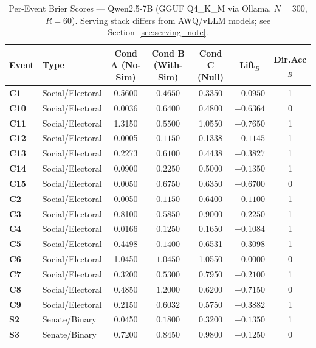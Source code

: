 \documentclass[11pt,journal,onecolumn]{IEEEtran}
\begin{document}
\begin{table}[!htbp]
\centering
\caption{Per-Event Brier Scores --- Qwen2.5-7B (GGUF Q4\_K\_M via Ollama, $N=300$, $R=60$). Serving stack differs from AWQ/vLLM models; see Section~\ref{sec:serving_note}.}
\label{tab:per_event_qwen_7b}
\small
\setlength{\tabcolsep}{4pt}
\begin{tabular}{llccccc}
\toprule
\textbf{Event} & \textbf{Type} & \textbf{Cond A (No-Sim)} & \textbf{Cond B (With-Sim)} & \textbf{Cond C (Null)} & \textbf{Lift$_B$} & \textbf{Dir.Acc$_B$} \\
\midrule
\textbf{C1} & Social/Electoral & 0.5600 & $\mathbf{0.4650}$ & 0.3350 & $\mathbf{+0.0950}$ & 1 \\
\textbf{C10} & Social/Electoral & 0.0036 & $0.6400$ & 0.4800 & $-0.6364$ & 0 \\
\textbf{C11} & Social/Electoral & 1.3150 & $\mathbf{0.5500}$ & 1.0550 & $\mathbf{+0.7650}$ & 1 \\
\textbf{C12} & Social/Electoral & 0.0005 & $0.1150$ & 0.1338 & $-0.1145$ & 1 \\
\textbf{C13} & Social/Electoral & 0.2273 & $0.6100$ & 0.4438 & $-0.3827$ & 1 \\
\textbf{C14} & Social/Electoral & 0.0900 & $0.2250$ & 0.5000 & $-0.1350$ & 1 \\
\textbf{C15} & Social/Electoral & 0.0050 & $0.6750$ & 0.6350 & $-0.6700$ & 0 \\
\textbf{C2} & Social/Electoral & 0.0050 & $0.1150$ & 0.6400 & $-0.1100$ & 1 \\
\textbf{C3} & Social/Electoral & 0.8100 & $\mathbf{0.5850}$ & 0.9000 & $\mathbf{+0.2250}$ & 1 \\
\textbf{C4} & Social/Electoral & 0.0166 & $0.1250$ & 0.1650 & $-0.1084$ & 1 \\
\textbf{C5} & Social/Electoral & 0.4498 & $\mathbf{0.1400}$ & 0.6531 & $\mathbf{+0.3098}$ & 1 \\
\textbf{C6} & Social/Electoral & 1.0450 & $1.0450$ & 1.0550 & $-0.0000$ & 0 \\
\textbf{C7} & Social/Electoral & 0.3200 & $0.5300$ & 0.7950 & $-0.2100$ & 1 \\
\textbf{C8} & Social/Electoral & 0.4850 & $1.2000$ & 0.6200 & $-0.7150$ & 0 \\
\textbf{C9} & Social/Electoral & 0.2150 & $0.6032$ & 0.5750 & $-0.3882$ & 1 \\
\textbf{S2} & Senate/Binary & 0.0450 & $0.1800$ & 0.3200 & $-0.1350$ & 1 \\
\textbf{S3} & Senate/Binary & 0.7200 & $0.8450$ & 0.9800 & $-0.1250$ & 0 \\

\end{tabular}
\end{table}
\end{document}
